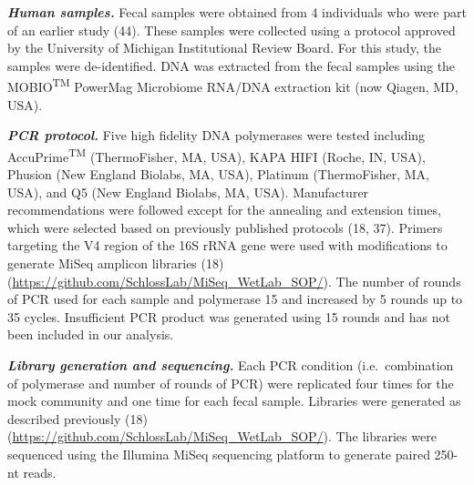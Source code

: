 \documentclass[11pt,]{article}
\begin{document}
\textbf{\emph{Human samples.}} Fecal samples were obtained from 4
individuals who were part of an earlier study (44). These samples were
collected using a protocol approved by the University of Michigan
Institutional Review Board. For this study, the samples were
de-identified. DNA was extracted from the fecal samples using the
MOBIO\textsuperscript{TM} PowerMag Microbiome RNA/DNA extraction kit
(now Qiagen, MD, USA).

\textbf{\emph{PCR protocol.}} Five high fidelity DNA polymerases were
tested including AccuPrime\textsuperscript{TM} (ThermoFisher, MA, USA),
KAPA HIFI (Roche, IN, USA), Phusion (New England Biolabs, MA, USA),
Platinum (ThermoFisher, MA, USA), and Q5 (New England Biolabs, MA, USA).
Manufacturer recommendations were followed except for the annealing and
extension times, which were selected based on previously published
protocols (18, 37). Primers targeting the V4 region of the 16S rRNA gene
were used with modifications to generate MiSeq amplicon libraries (18)
(\url{https://github.com/SchlossLab/MiSeq_WetLab_SOP/}). The number of
rounds of PCR used for each sample and polymerase 15 and increased by 5
rounds up to 35 cycles. Insufficient PCR product was generated using 15
rounds and has not been included in our analysis.

\textbf{\emph{Library generation and sequencing.}} Each PCR condition
(i.e.~combination of polymerase and number of rounds of PCR) were
replicated four times for the mock community and one time for each fecal
sample. Libraries were generated as described previously (18)
(\url{https://github.com/SchlossLab/MiSeq_WetLab_SOP/}). The libraries
were sequenced using the Illumina MiSeq sequencing platform to generate
paired 250-nt reads.
\end{document}

